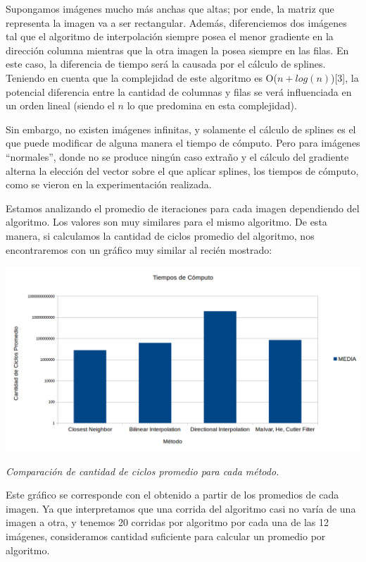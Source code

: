 \begin{itemize}
Supongamos imágenes mucho más anchas que altas; por ende, la matriz que representa la imagen va a ser rectangular. Además, diferenciemos dos imágenes tal que el algoritmo de interpolación siempre posea el menor gradiente en la dirección columna mientras que la otra imagen la posea siempre en las filas. En este caso, la diferencia de tiempo será la causada por el cálculo de splines. Teniendo en cuenta que la complejidad de este algoritmo es O($n + log(n)$)[3], la potencial diferencia entre la cantidad de columnas y filas se verá influenciada en un orden lineal (siendo el $n$ lo que predomina en esta complejidad).

Sin embargo, no existen imágenes infinitas, y solamente el cálculo de splines es el que puede modificar de alguna manera el tiempo de cómputo. Pero para imágenes ``normales'', donde no se produce ningún caso extraño y el cálculo del gradiente alterna la elección del vector sobre el que aplicar splines, los tiempos de cómputo, como se vieron en la experimentación realizada.


\vspace{\baselineskip}

Estamos analizando el promedio de iteraciones para cada imagen dependiendo del algoritmo. Los valores son muy similares para el mismo algoritmo. De esta manera, si calculamos la cantidad de ciclos promedio del algoritmo, nos encontraremos con un gráfico muy similar al recién mostrado:

	\begin{center}
		\includegraphics[scale=0.4]{./img/tiemposDeComputo.png}
		\vspace{2pt}
		\par
		\footnotesize\textit{Comparación de cantidad de ciclos promedio para cada método.}
	\end{center}

Este gráfico se corresponde con el obtenido a partir de los promedios de cada imagen. Ya que interpretamos que una corrida del algoritmo casi no varía de una imagen a otra, y tenemos 20 corridas por algoritmo por cada una de las 12 imágenes, consideramos cantidad suficiente para calcular un promedio por algoritmo.


\end{itemize}
